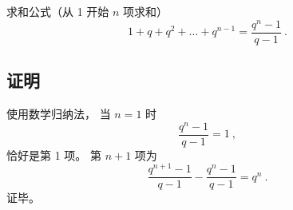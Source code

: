 
\begin{issues}
\issueAbstract
\issueNeedCite
{}
\end{issues}



求和公式（从 1 开始 $n$ 项求和）
\begin{equation}
1 + q + q^2 + \dots + q^{n-1} = \frac{q^n - 1}{q - 1}~.
\end{equation}

\subsection{证明}
使用数学归纳法， 当 $n = 1$ 时
\begin{equation}
\frac{q^n - 1}{q - 1} = 1~,
\end{equation}
恰好是第 1 项。 第 $n + 1$ 项为
\begin{equation}
\frac{q^{n+1} - 1}{q - 1} - \frac{q^n - 1}{q - 1} = q^n~.
\end{equation}
证毕。
